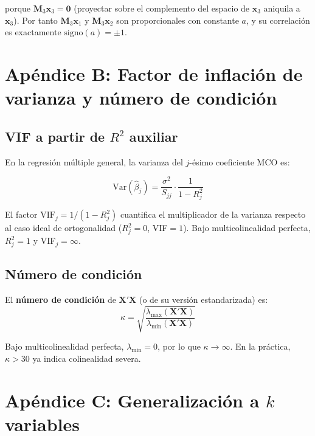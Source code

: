 \documentclass[12pt, letterpaper]{article}
\theoremstyle{remark}
\begin{document}
\noindent porque $\mathbf{M}_3\mathbf{x}_3 = \mathbf{0}$ (proyectar sobre el
complemento del espacio de $\mathbf{x}_3$ aniquila a $\mathbf{x}_3$). Por tanto
$\mathbf{M}_3\mathbf{x}_1$ y $\mathbf{M}_3\mathbf{x}_2$ son proporcionales con
constante $a$, y su correlación es exactamente $\text{signo}(a) = \pm 1$.

\section{Apéndice B: Factor de inflación de varianza y número de condición}

\subsection{VIF a partir de $R^2$ auxiliar}

En la regresión múltiple general, la varianza del $j$-ésimo coeficiente MCO es:

\begin{equation}
  \text{Var}(\hat\beta_j) = \frac{\sigma^2}{S_{jj}}\cdot\frac{1}{1-R_j^2}
  \label{eq:var_vif_general}
\end{equation}

\noindent El factor $\text{VIF}_j = 1/(1-R_j^2)$ cuantifica el multiplicador de
la varianza respecto al caso ideal de ortogonalidad ($R_j^2 = 0$, VIF$=1$).
Bajo multicolinealidad perfecta, $R_j^2 = 1$ y VIF$_j = \infty$.

\subsection{Número de condición}

El \textbf{número de condición} de $\mathbf{X'X}$ (o de su versión estandarizada)
es:
\begin{equation}
  \kappa = \sqrt{\frac{\lambda_{\max}(\mathbf{X'X})}{\lambda_{\min}(\mathbf{X'X})}}
  \label{eq:kappa}
\end{equation}

\noindent Bajo multicolinealidad perfecta, $\lambda_{\min} = 0$, por lo que
$\kappa \to \infty$. En la práctica, $\kappa > 30$ ya indica colinealidad severa.

\section{Apéndice C: Generalización a $k$ variables}
\end{document}
